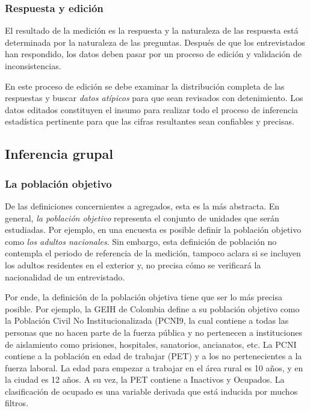 \documentclass[
  10pt,
  spanish,
]{book}
\begin{document}
\hypertarget{respuesta-y-ediciuxf3n}{%
\subsubsection*{Respuesta y edición}\label{respuesta-y-ediciuxf3n}}

El resultado de la medición es la respuesta y la naturaleza de las respuesta está determinada por la naturaleza de las preguntas. Después de que los entrevistados han respondido, los datos deben pasar por un proceso de edición y validación de inconsistencias.

En este proceso de edición se debe examinar la distribución completa de las respuestas y buscar \emph{datos atípicos} para que sean revisados con detenimiento. Los datos editados constituyen el insumo para realizar todo el proceso de inferencia estadística pertinente para que las cifras resultantes sean confiables y precisas.

\hypertarget{inferencia-grupal}{%
\subsection{Inferencia grupal}\label{inferencia-grupal}}

\hypertarget{la-poblaciuxf3n-objetivo}{%
\subsubsection*{La población objetivo}\label{la-poblaciuxf3n-objetivo}}

De las definiciones concernientes a agregados, esta es la más abstracta. En general, \emph{la población objetivo} representa el conjunto de unidades que serán estudiadas. Por ejemplo, en una encuesta es posible definir la población objetivo como \emph{los adultos nacionales}. Sin embargo, esta definición de población no contempla el periodo de referencia de la medición, tampoco aclara si se incluyen los adultos residentes en el exterior y, no precisa cómo se verificará la nacionalidad de un entrevistado.

Por ende, la definición de la población objetiva tiene que ser lo más precisa posible. Por ejemplo, la GEIH de Colombia define a su población objetivo como la Población Civil No Institucionalizada (PCNI9, la cual contiene a todas las personas que no hacen parte de la fuerza pública y no pertenecen a instituciones de aislamiento como prisiones, hospitales, sanatorios, ancianatos, etc. La PCNI contiene a la población en edad de trabajar (PET) y a los no pertenecientes a la fuerza laboral. La edad para empezar a trabajar en el área rural es 10 años, y en la ciudad es 12 años. A su vez, la PET contiene a Inactivos y Ocupados. La clasificación de ocupado es una variable derivada que está inducida por muchos filtros.
\end{document}
